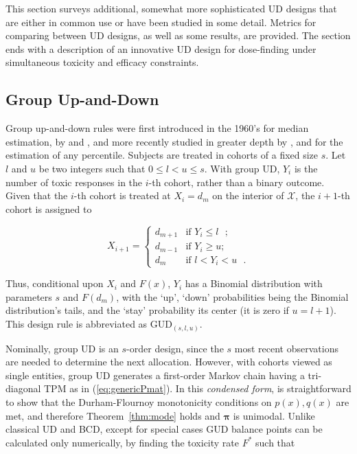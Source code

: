 This section surveys additional, somewhat more sophisticated UD designs that are either in common use or have been studied in some detail. Metrics for comparing between UD designs, as well as some results, are provided. The section ends with a description of an innovative UD design for dose-finding under simultaneous toxicity and efficacy constraints.

\subsection{Group Up-and-Down}\label{sec:gud}

Group up-and-down rules were first introduced in the 1960's for median estimation, by \cite{Weth:Sequ:1963} and \cite{Tsut:asym:1967,Tsut:rand:1967}, and more recently studied in greater depth by \cite{Gezm:Flou:Grou:2006}, \cite{Ivan:esca:2006} and \cite{Bald:Bort:Giov:2008} for the estimation of any percentile. Subjects are treated in cohorts of a fixed size $s$. Let $l$ and $u$ be two integers such that $0\le l< u\le s$. With group UD, $Y_i$ is the number of toxic responses in the $i$-th cohort, rather than a binary outcome. Given that the $i$-th cohort is treated at $X_i=d_m$ on the interior of $\mathcal{X}$, the $i+1$-th cohort is assigned to

\begin{equation*}
X_{i+1}=
\begin{cases}
d_{m+1} &\textrm{if $Y_i\le l$ };\\
d_{m-1} &\textrm{if $Y_i\ge u$};\\
d_m &\textrm{if $l<Y_i<u$ }.
\end{cases}
\end{equation*}

Thus, conditional upon $X_i$ and $F(x)$, $Y_i$ has a Binomial distribution with parameters $s$ and $F(d_m)$, with the `up', `down' probabilities being the Binomial distribution's tails, and the `stay' probability its center (it is zero if $u=l+1$). This design rule is abbreviated as GUD$_{(s,l,u)}$.

Nominally, group UD is an $s$-order design, since the $s$ most recent observations are needed to determine the next allocation. However, with cohorts viewed as single entities, group UD generates a first-order Markov chain having a tri-diagonal TPM as in (\ref{eq:genericPmat}). In this \emph{condensed form}, is straightforward to show that the Durham-Flournoy monotonicity conditions on $p(x),q(x)$ are met, and therefore Theorem~\ref{thm:mode} holds and $\boldsymbol{\pi}$ is unimodal. Unlike classical UD and BCD, except for special cases GUD balance points can be calculated only numerically, by finding the toxicity rate $F^*$ such that

